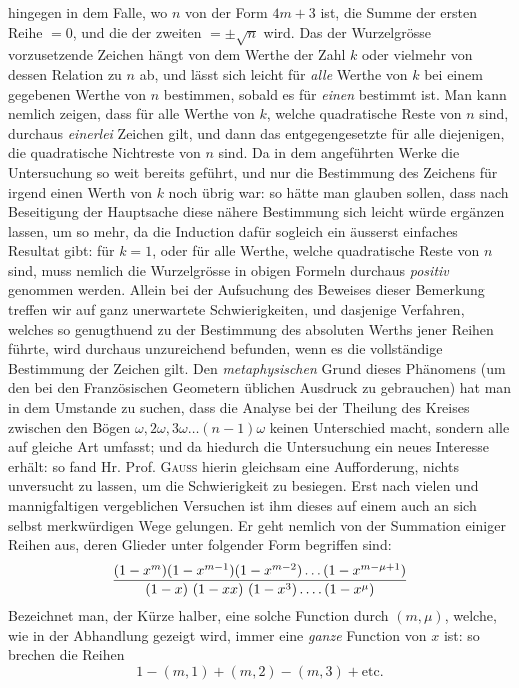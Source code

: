 %
hingegen in dem Falle, wo $n$ von der Form $4m+3$ ist, die Summe der ersten Reihe $=0$, und die der zweiten $=\pm\surd n$ wird. Das der Wurzelgrösse vorzusetzende Zeichen hängt von dem Werthe der Zahl $k$ oder vielmehr von dessen Relation zu $n$ ab, und lässt sich leicht für \emph{alle} Werthe von $k$ bei einem gegebenen Werthe von $n$ bestimmen, sobald es für \emph{einen} bestimmt ist. Man kann nemlich zeigen, dass für alle Werthe von $k$, welche quadratische Reste von $n$ sind, durchaus \emph{einerlei} Zeichen gilt, und dann das entgegengesetzte für alle diejenigen, die quadratische Nichtreste von $n$ sind. Da in dem angeführten Werke die Untersuchung so weit bereits geführt, und nur die Bestimmung des Zeichens für irgend einen Werth von $k$ noch übrig war: so hätte man glauben sollen, dass nach Beseitigung der Hauptsache diese nähere Bestimmung sich leicht würde ergänzen lassen, um so mehr, da die Induction dafür sogleich ein äusserst einfaches Resultat gibt: für $k=1$, oder für alle Werthe, welche quadratische Reste von $n$ sind, muss nemlich die Wurzelgrösse in obigen Formeln durchaus \emph{positiv} genommen werden. Allein bei der Aufsuchung des Beweises dieser Bemerkung treffen wir auf ganz unerwartete Schwierigkeiten, und dasjenige Verfahren, welches so genugthuend zu der Bestimmung des absoluten Werths jener Reihen führte, wird durchaus unzureichend befunden, wenn es die vollständige Bestimmung der Zeichen gilt. Den \emph{metaphysischen} Grund dieses Phänomens (um den bei den Französischen Geometern üblichen Ausdruck zu gebrauchen) hat man in dem Umstande zu suchen, dass die Analyse bei der Theilung des Kreises zwischen den Bögen $\omega,2\omega,3\omega\ldots(n-1)\omega$ keinen Unterschied macht, sondern alle auf gleiche Art umfasst; und da hiedurch die Untersuchung ein neues Interesse erhält: so fand Hr. Prof. \textsc{Gauss} hierin gleichsam eine Aufforderung, nichts unversucht zu lassen, um die Schwierigkeit zu besiegen. Erst nach vielen und mannigfaltigen vergeblichen Versuchen ist ihm dieses auf einem auch an sich selbst merkwürdigen Wege gelungen. Er geht nemlich von der Summation einiger Reihen aus, deren Glieder unter folgender Form begriffen sind:
\[
\frac{(1-x^m)(1-x^{m-1})(1-x^{m-2})\ldots(1-x^{m-\mu+1})}{(1-x)\ (1-xx)\ (1-x^3)\dotsfour(1-x^\mu)}
\]
Bezeichnet man, der Kürze halber, eine solche Function durch $(m,\mu)$, welche, wie in der Abhandlung gezeigt wird, immer eine \emph{ganze} Function von $x$ ist: so brechen die Reihen
%
\[
1-(m,1)+(m,2)-(m,3)+\text{etc.}
\]
